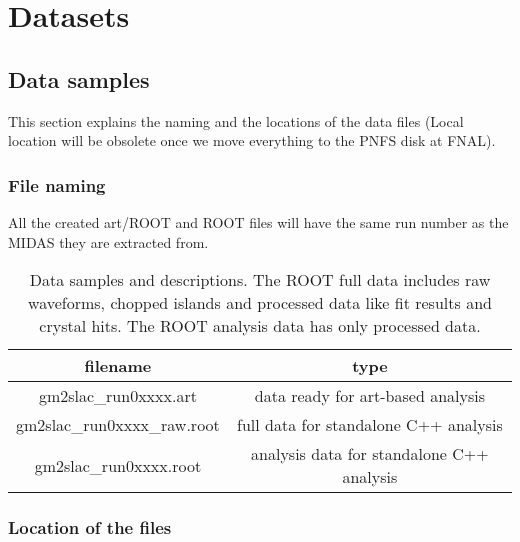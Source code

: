\chapter{Datasets}
\label{chap:two}

\section{Data samples}

This section explains the naming and the locations of the data files (Local location will be obsolete once we move everything
to the PNFS disk at FNAL).

\subsection{File naming}

All the created art/ROOT and ROOT files will have the same run number as the MIDAS they are extracted from.

\begin{table}[htbp]
\centering
\caption{Data samples and descriptions. The ROOT full data includes raw waveforms, chopped islands and processed data like fit results and crystal hits. The ROOT analysis data has only processed data.}
\begin{tabular}{|c|c|} \hline 
filename & type \\ \hline 
gm2slac\_run0xxxx.art & data ready for art-based analysis \\ \hline 
gm2slac\_run0xxxx\_raw.root & full data for standalone C++ analysis \\ \hline 
gm2slac\_run0xxxx.root & analysis data for standalone C++ analysis \\ \hline 
\end{tabular} \label{tab:datasamples}
\end{table}

\subsection{Location of the files}

